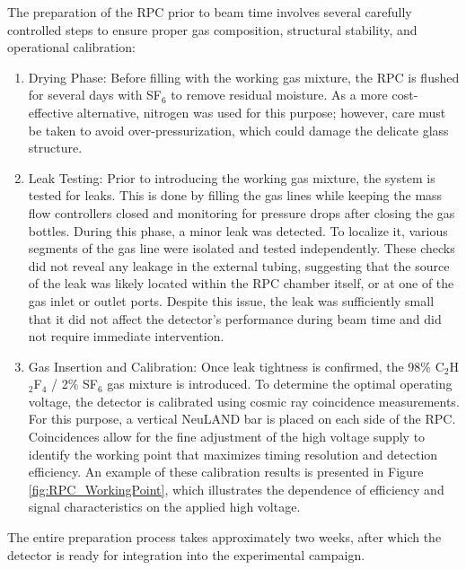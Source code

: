 {{{The preparation of the \gls{RPC} prior to beam time involves several carefully controlled steps to ensure proper gas composition, structural stability, and operational calibration:

\begin{enumerate}
	\item Drying Phase: Before filling with the working gas mixture, the \gls{RPC} is flushed for several days with SF$_6$ to remove residual moisture. As a more cost-effective alternative, nitrogen was used for this purpose; however, care must be taken to avoid over-pressurization, which could damage the delicate glass structure.
	\item Leak Testing: Prior to introducing the working gas mixture, the system is tested for leaks. This is done by filling the gas lines while keeping the mass flow controllers closed and monitoring for pressure drops after closing the gas bottles. During this phase, a minor leak was detected. To localize it, various segments of the gas line were isolated and tested independently. These checks did not reveal any leakage in the external tubing, suggesting that the source of the leak was likely located within the \gls{RPC} chamber itself, or at one of the gas inlet or outlet ports. Despite this issue, the leak was sufficiently small that it did not affect the detector’s performance during beam time and did not require immediate intervention.
	\item Gas Insertion and Calibration: Once leak tightness is confirmed, the 98\% C$_2$H$_2$F$_4$ / 2\% SF$_6$ gas mixture is introduced. To determine the optimal operating voltage, the detector is calibrated using cosmic ray coincidence measurements. For this purpose, a vertical NeuLAND bar is placed on each side of the \gls{RPC}. Coincidences allow for the fine adjustment of the high voltage supply to identify the working point that maximizes timing resolution and detection efficiency. An example of these calibration results is presented in Figure \ref{fig:RPC_WorkingPoint}, which illustrates the dependence of efficiency and signal characteristics on the applied high voltage.
\end{enumerate}



The entire preparation process takes approximately two weeks, after which the detector is ready for integration into the experimental campaign.

}}}
